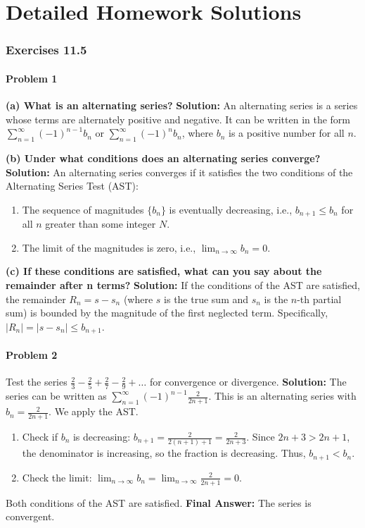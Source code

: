 \documentclass{article}
\begin{document}
\part{Detailed Homework Solutions}

\section*{Exercises 11.5}

\subsection*{Problem 1}
\textbf{(a) What is an alternating series?}
\textbf{Solution:} An alternating series is a series whose terms are alternately positive and negative. It can be written in the form $\sum_{n=1}^{\infty} (-1)^{n-1} b_n$ or $\sum_{n=1}^{\infty} (-1)^{n} b_n$, where $b_n$ is a positive number for all $n$.

\textbf{(b) Under what conditions does an alternating series converge?}
\textbf{Solution:} An alternating series converges if it satisfies the two conditions of the Alternating Series Test (AST):
\begin{enumerate}
    \item The sequence of magnitudes $\{b_n\}$ is eventually decreasing, i.e., $b_{n+1} \le b_n$ for all $n$ greater than some integer $N$.
    \item The limit of the magnitudes is zero, i.e., $\lim_{n \to \infty} b_n = 0$.
\end{enumerate}

\textbf{(c) If these conditions are satisfied, what can you say about the remainder after n terms?}
\textbf{Solution:} If the conditions of the AST are satisfied, the remainder $R_n = s - s_n$ (where $s$ is the true sum and $s_n$ is the $n$-th partial sum) is bounded by the magnitude of the first neglected term. Specifically, $|R_n| = |s - s_n| \le b_{n+1}$.

\subsection*{Problem 2}
Test the series $\frac{2}{3} - \frac{2}{5} + \frac{2}{7} - \frac{2}{9} + \dots$ for convergence or divergence.
\textbf{Solution:} The series can be written as $\sum_{n=1}^{\infty} (-1)^{n-1} \frac{2}{2n+1}$. This is an alternating series with $b_n = \frac{2}{2n+1}$. We apply the AST.
\begin{enumerate}
    \item Check if $b_n$ is decreasing: $b_{n+1} = \frac{2}{2(n+1)+1} = \frac{2}{2n+3}$. Since $2n+3 > 2n+1$, the denominator is increasing, so the fraction is decreasing. Thus, $b_{n+1} < b_n$.
    \item Check the limit: $\lim_{n \to \infty} b_n = \lim_{n \to \infty} \frac{2}{2n+1} = 0$.
\end{enumerate}
Both conditions of the AST are satisfied.
\textbf{Final Answer:} The series is convergent.
\end{document}
